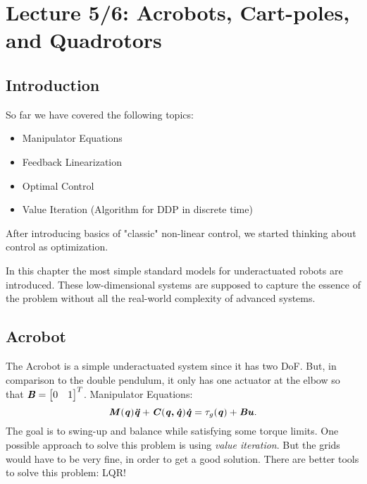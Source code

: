 \chapter{Lecture 5/6: Acrobots, Cart-poles, and Quadrotors}
\section{Introduction}
So far we have covered the following topics:
\begin{itemize}
\item Manipulator Equations
\item Feedback Linearization
\item Optimal Control
\item Value Iteration (Algorithm for DDP in discrete time)
\end{itemize}
After introducing basics of "classic" non-linear control, we started thinking about control as optimization.

In this chapter the most simple standard models for underactuated robots are introduced. These low-dimensional systems are supposed to capture the essence of the problem without all the real-world complexity of advanced systems. 

\section{Acrobot}
The Acrobot is a simple underactuated system since it has two DoF. But, in comparison to the double pendulum, it only has one actuator at the elbow so that 
$\bm{\mathit{B}}=\begin{bmatrix} 0 & 1 \end{bmatrix}^T $.
Manipulator Equations: 
\begin{equation*}
\bm{\mathit{M}}(\bm{\mathit{q}})\bm{\mathit{\ddot{q}}}+\bm{\mathit{C}}(\bm{\mathit{q,\dot{q}}})\bm{\mathit{\dot{q}}}=\tau_g(\bm{\mathit{q}})+\bm{\mathit{Bu}}.
\end{equation*}
The goal is to swing-up and balance while satisfying some torque limits. One possible approach to solve this problem is using \textit{value iteration}. But the grids would have to be very fine, in order to get a good solution. There are better tools to solve this problem: LQR!

